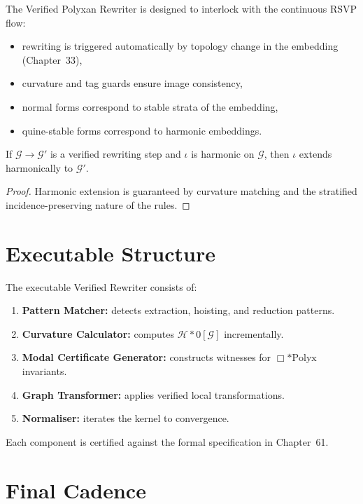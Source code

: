 The Verified Polyxan Rewriter is designed to interlock with the continuous RSVP flow:
\begin{itemize}
\item rewriting is triggered automatically by topology change in the embedding (Chapter~33),
\item curvature and tag guards ensure image consistency,
\item normal forms correspond to stable strata of the embedding,
\item quine-stable forms correspond to harmonic embeddings.
\end{itemize}

\begin{theorem}
If $\mathcal{G}\to\mathcal{G}'$ is a verified rewriting step and $\iota$ is harmonic on $\mathcal{G}$,
then $\iota$ extends harmonically to $\mathcal{G}'$.
\end{theorem}

\begin{proof}
Harmonic extension is guaranteed by curvature matching and the stratified incidence-preserving nature of the rules.
\end{proof}

\section{Executable Structure}

The executable Verified Rewriter consists of:
\begin{enumerate}
\item \textbf{Pattern Matcher:} detects extraction, hoisting, and reduction patterns.
\item \textbf{Curvature Calculator:} computes $\mathcal{H}*0[\mathcal{G}]$ incrementally.
\item \textbf{Modal Certificate Generator:} constructs witnesses for $\Box*{\mathrm{Polyx}}$ invariants.
\item \textbf{Graph Transformer:} applies verified local transformations.
\item \textbf{Normaliser:} iterates the kernel to convergence.
\end{enumerate}

Each component is certified against the formal specification in Chapter~61.

\section{Final Cadence}

